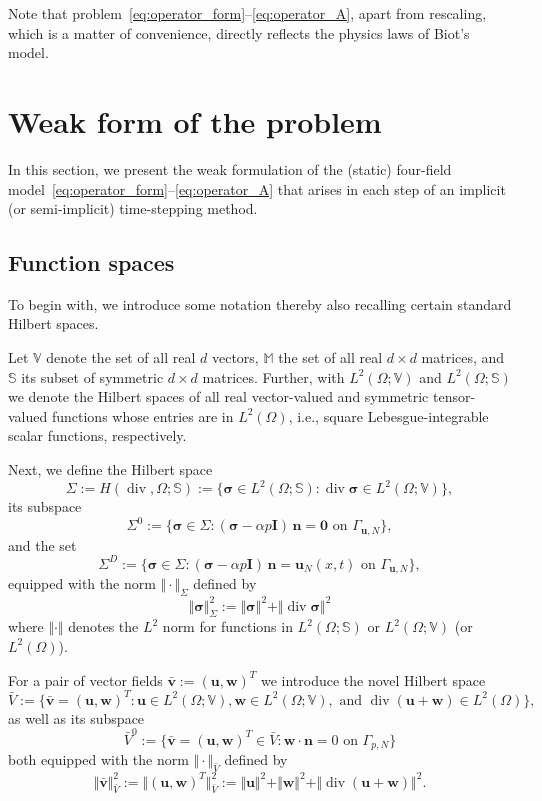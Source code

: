\documentclass[11pt]{amsart}
\theoremstyle{remark}
\theoremstyle{definition}
\def\sig{{\bm \sigma}}
\def\bu{{\boldsymbol u}}
\def\bv{{\boldsymbol v}}
\def\bw{{\boldsymbol w}}
\renewcommand{\div}{\operatorname{div}}
\renewcommand{\div}{\operatorname{div}}
\def\sig{\boldsymbol \sigma}
\def\bu{\boldsymbol u}
\def\bv{\boldsymbol v}
\def\bw{\boldsymbol w}
\def\bn{\boldsymbol n}
\begin{document}
{
Note that problem~\eqref{eq:operator_form}--\eqref{eq:operator_A}, apart from rescaling, which is a matter of convenience, directly reflects the physics laws of Biot's model.}

\section{Weak form of the problem}\label{sec:weak_form} 

In this section, we present the weak formulation of the (static) four-field model~\eqref{eq:operator_form}--\eqref{eq:operator_A}
that arises in each step of an implicit (or semi-implicit) time-stepping method.

\subsection{Function spaces}\label{subsec:function_spaces} 

To begin with, we introduce some notation thereby also recalling certain standard Hilbert spaces.

Let $\mathbb{V}$ denote the set of all real $d$ vectors, $\mathbb{M}$ the set of all real $d{\times}d$ matrices, and $\mathbb{S}$ its subset of
symmetric $d{\times}d$ matrices. 
%
Further, with $L^2(\Omega;\mathbb{V})$ and $L^2(\Omega;\mathbb{S})$ we denote the Hilbert spaces of all real vector-valued and symmetric tensor-valued functions whose entries are in $L^2(\Omega)$, i.e., square Lebesgue-integrable scalar functions, respectively.

Next, we define the Hilbert space
$$
\Sigma := H(\div,\Omega;\mathbb{S}) :=\{ \sig  \in L^2(\Omega;\mathbb{S}): \div \sig \in  L^2(\Omega;\mathbb{V}) \},
$$
its subspace
$$
\Sigma^0 :=\{ \sig \in \Sigma: (\sig -\alpha p  \boldsymbol I) \, \bn = \bm 0 \text{ on }\Gamma_{\bu,N}\},
$$
and the set
$$
\Sigma^D :=\{\sig \in \Sigma: (\sig -\alpha p  \boldsymbol I) \, \bn = \bu_{N}(x,t) \text{ on }\Gamma_{\bu,N}\},
$$
equipped with the norm $\Vert \cdot \Vert_\Sigma$ defined by
$$
\Vert \sig \Vert_\Sigma^2 := \Vert \sig \Vert^2 + \Vert \div \sig \Vert^2
$$
where $\Vert \cdot \Vert$ denotes the $L^2$ norm for functions in $L^2(\Omega;\mathbb{S})$ or $L^2(\Omega;\mathbb{V})$ (or $L^2(\Omega)$).

For a pair of vector fields $\bar{\bv} := (\bu,\bw)^T$ we introduce the novel Hilbert space
$$
\bar{V} := \{ \bar{\bv} = (\bu,\bw)^T:  \bu \in L^2(\Omega;\mathbb{V}), \bw \in L^2(\Omega;\mathbb{V}), \mbox{ and } \div (\bu + \bw) \in  L^2(\Omega) \},
$$
as well as its subspace
$$
\bar{V}^0 := \{ \bar{\bv} = (\bu,\bw)^T  \in \bar{V}: \bw \cdot \bn = 0 \text{ on }\Gamma_{p,N} \}
$$
both equipped with the norm $\Vert \cdot \Vert_{\bar{V}}$ defined by
$$
\Vert \bar{\bv} \Vert_{\bar{V}}^2 := \Vert (\bu,\bw)^T  \Vert_{\bar{V}}^2 
:= \Vert \bu \Vert^2 + \Vert \bw \Vert^2 + \Vert \div (\bu + \bw)  \Vert^2.
$$
\end{document}
